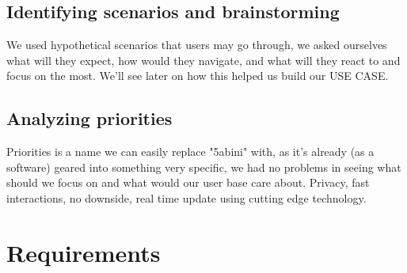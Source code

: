 \documentclass[12pt]{article}
\begin{document}
\subsection{Identifying scenarios and brainstorming}
We used hypothetical scenarios that users may go through, we asked ourselves what will they expect, how would they navigate, and what will they react to and focus on the most.
We'll see later on how this helped us build our USE CASE.
\subsection{Analyzing priorities}
Priorities is a name we can easily replace "5abini" with, as it's already (as a software) geared into something very specific, we had no problems in seeing what should we focus on and what would our user base care about. Privacy, fast interactions, no downside, real time update using cutting edge technology.
\section{Requirements}
\end{document}
